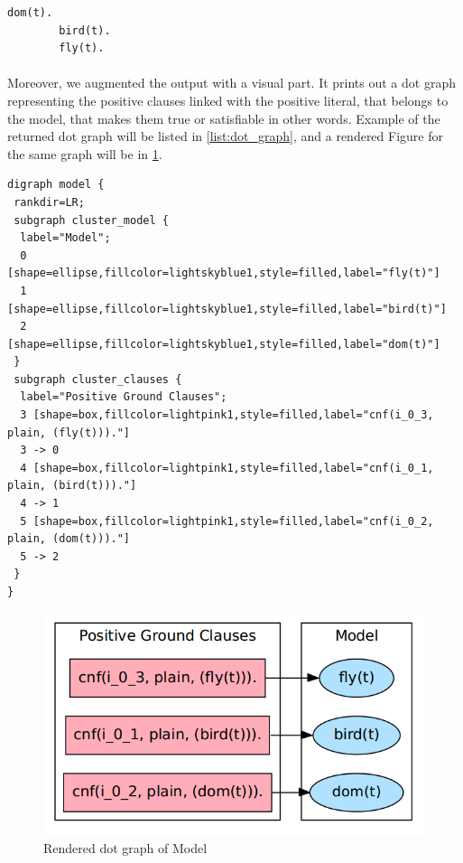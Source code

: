 		
			\begin{minipage}{\textwidth}
			\begin{lstlisting}[caption=Example for the returned Model,label={list:model_example},frame=single]
		dom(t).
		bird(t).
		fly(t).
			\end{lstlisting} 
			\end{minipage}						
				
		\paragraph{}
		Moreover, we augmented the output with a visual part. It prints out a dot graph representing the positive clauses linked with the positive literal, that belongs to the model, that makes them true or satisfiable in other words. Example of the returned dot graph will be listed in \ref{list:dot_graph}, and a rendered Figure for the same graph will be in \ref{fig:dot_graph}.
		
			\begin{minipage}{\textwidth}
			\begin{lstlisting}[caption=Example of returned dot graph,label={list:dot_graph},breaklines=true,frame=single]
digraph model {
 rankdir=LR;
 subgraph cluster_model {
  label="Model"; 
  0 [shape=ellipse,fillcolor=lightskyblue1,style=filled,label="fly(t)"]
  1 [shape=ellipse,fillcolor=lightskyblue1,style=filled,label="bird(t)"]
  2 [shape=ellipse,fillcolor=lightskyblue1,style=filled,label="dom(t)"]
 }
 subgraph cluster_clauses {
  label="Positive Ground Clauses"; 
  3 [shape=box,fillcolor=lightpink1,style=filled,label="cnf(i_0_3, plain, (fly(t)))."]
  3 -> 0
  4 [shape=box,fillcolor=lightpink1,style=filled,label="cnf(i_0_1, plain, (bird(t)))."]
  4 -> 1
  5 [shape=box,fillcolor=lightpink1,style=filled,label="cnf(i_0_2, plain, (dom(t)))."]
  5 -> 2
 }
}
			\end{lstlisting} 
			\end{minipage}						

						
			\begin{figure}[H]
				\centering
				\includegraphics[scale=0.42]{pictures/dot_graph.png}
				\caption{Rendered dot graph of Model\label{fig:dot_graph}}
			\end{figure}
		